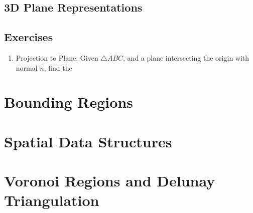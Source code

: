 \documentclass[12pt]{report}
\begin{document}
		\section{3D Plane Representations}
		\section{Exercises}
			\begin{enumerate}
				\item Projection to Plane: Given $\triangle ABC$, and a plane intersecting the origin with normal $n$, find the 
			\end{enumerate}
	\chapter{Bounding Regions}
	\chapter{Spatial Data Structures}
	\chapter{Voronoi Regions and Delunay Triangulation}
\end{document}
